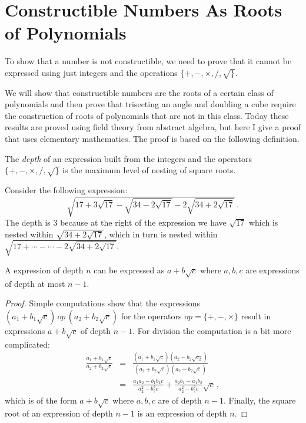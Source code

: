 \newpage

\section{Constructible Numbers As Roots of Polynomials}\label{s.trisect-poly}
To show that a number is not constructible, we need to prove that it cannot be expressed using just integers and the operations $\{+,-,\times,/,\surd\}$.

We will show that constructible numbers are the roots of a certain class of polynomials and then prove that trisecting an angle and doubling a cube require the construction of roots of polynomials that are not in this class. Today these results are proved using field theory from abstract algebra, but here I give a proof that uses elementary mathematics. The proof is based on the following definition.

\begin{definition}
The \emph{depth} of an expression built from the integers and the operators $\{+,-,\times,/,\surd\}$ is the maximum level of nesting of square roots.
\end{definition}

\begin{example}
Consider the following expression:
\[
\sqrt{17+3\sqrt{17} - \sqrt{34-2\sqrt{17}}
  -2\sqrt{34+2\sqrt{17}} }\,.
\]
The depth is $3$ because at the right of the expression we have $\sqrt{17}$ which is nested within $\sqrt{34+2\sqrt{17}}$, which in turn is nested within $\sqrt{17+\cdots-\cdots-2\sqrt{34+2\sqrt{17}}}$.
\end{example}

\begin{theorem}
A expression of depth $n$ can be expressed as $a+b\sqrt{c}$ where $a,b,c$ are expressions of depth at most $n-1$.
\end{theorem}
\begin{proof}
Simple computations show that the expressions $(a_1+b_1\sqrt{c})\,\mathit{op}\,(a_2+b_2\sqrt{c})$ for the operators $\mathit{op}=\{+,-,\times\}$ result in expressions $a+b\sqrt{c}$ of depth $n-1$. For division the computation is a bit more complicated:
\begin{eqnarray*}
\frac{a_1+b_1\sqrt{c}}{a_2+b_2\sqrt{c}}&=&
\frac{(a_1+b_1\sqrt{c})(a_2-b_2\sqrt{c_2})}{(a_2+b_2\sqrt{c})(a_2-b_2\sqrt{c})}\\
&=&\frac{a_1a_2-b_1b_2c}{a_2^2-b_2^2c}+\frac{a_2b_1-a_1b_2}{a_2^2-b_2^2c}\sqrt{c}\,,
\end{eqnarray*}
which is of the form $a+b\sqrt{c}$ where $a,b,c$ are of depth $n-1$.
Finally, the square root of an expression of depth $n-1$ is an expression of depth $n$.
\end{proof}


